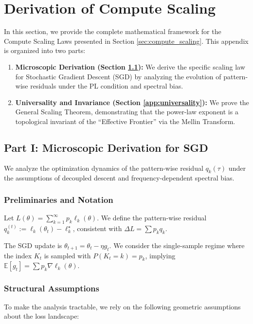 \documentclass{article}
\theoremstyle{plain}
\theoremstyle{definition}
\theoremstyle{remark}
\begin{document}
\section{Derivation of Compute Scaling}
\label{app:compute_scaling}

In this section, we provide the complete mathematical framework for the Compute Scaling Laws presented in Section \ref{sec:compute_scaling}. This appendix is organized into two parts:
\begin{enumerate}
    \item \textbf{Microscopic Derivation (Section \ref{app:sgd_micro}):} We derive the specific scaling law for Stochastic Gradient Descent (SGD) by analyzing the evolution of pattern-wise residuals under the PL condition and spectral bias.
    \item \textbf{Universality and Invariance (Section \ref{app:universality}):} We prove the General Scaling Theorem, demonstrating that the power-law exponent is a topological invariant of the ``Effective Frontier'' via the Mellin Transform.
\end{enumerate}


\subsection{Part I: Microscopic Derivation for SGD}
\label{app:sgd_micro}

We analyze the optimization dynamics of the pattern-wise residual $q_k(\tau)$ under the assumptions of decoupled descent and frequency-dependent spectral bias.

\subsubsection{Preliminaries and Notation}


Let $L(\theta) = \sum_{k=1}^\infty p_k \ell_k(\theta)$. We define the pattern-wise residual $q_k^{(t)} := \ell_k(\theta_t) - \ell_k^\star$, consistent with $\Delta L = \sum p_k q_k$.

The SGD update is $\theta_{t+1} = \theta_t - \eta g_t$. We consider the single-sample regime where the index $K_t$ is sampled with $P(K_t = k) = p_k$, implying $\mathbb{E}[g_t] = \sum p_k \nabla \ell_k(\theta)$.

\subsubsection{Structural Assumptions}
To make the analysis tractable, we rely on the following geometric assumptions about the loss landscape:
\end{document}
